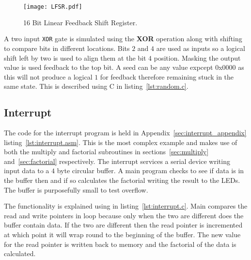 \begin{figure}[ht]
   \centering
    \texttt{[image: LFSR.pdf]}
		\caption{16 Bit Linear Feedback Shift Register.}%
   \label{fig:lfsr}
\end{figure}

A two input \texttt{XOR} gate is simulated using the \textbf{XOR} operation along with shifting to compare bits in different locations.
Bits $2$ and $4$ are used as inputs so a logical shift left by two is used to align them at the bit $4$ position. 
Masking the output value is used feedback to the top bit.
A seed can be any value expcept $0$x$0000$ as this will not produce a logical $1$ for feedback therefore remaining stuck in the same state.
This is described using C in listing~\ref{lst:random.c}. 

\begin{minipage}{\linewidth}

\end{minipage}




\subsection{Interrupt}
The code for the interrupt program is held in Appendix~\ref{sec:interrupt_appendix} listing~\ref{lst:interrupt.asm}.
This is the most complex example and makes use of both the multiply and factorial subroutines in sections~\ref{sec:multiply} and~\ref{sec:factorial} respectively.
The interrupt services a serial device writing input data to a $4$ byte circular buffer. 
A main program checks to see if data is in the buffer then and if so calculates the factorial writing the result to the LEDs.
The buffer is purposefully small to test overflow.

The functionality is explained using in listing~\ref{lst:interrupt.c}.
Main compares the read and write pointers in loop because only when the two are different does the buffer contain data.
If the two are different then the read pointer is incremented at which point it will wrap round to the beginning of the buffer.
The new value for the read pointer is written back to memory and the factorial of the data is calculated.


\newpage




